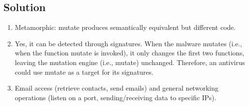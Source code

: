 \subsection*{Solution}
\begin{enumerate}
    \item Metamorphic: mutate produces semantically equivalent but different code. 
    \item Yes, it can be detected through signatures.
        When the malware mutates (i.e., when the function mutate is invoked), it only changes the first two functions, leaving the mutation engine (i.e., mutate) unchanged. 
        Therefore, an antivirus could use mutate as a target for its signatures.
    \item Email access (retrieve contacts, send emails) and general networking operations (listen on a port, sending/receiving data to specific IPs).
\end{enumerate}